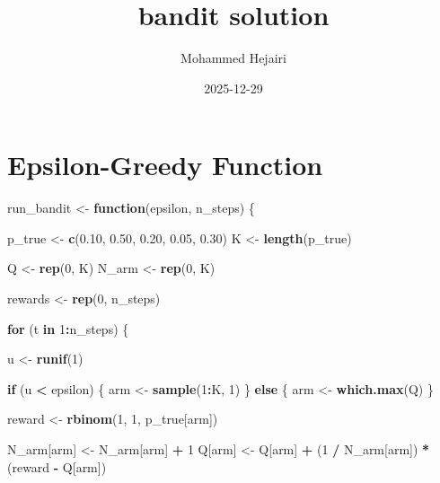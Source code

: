 \documentclass[
]{article}
\title{bandit solution}
\author{Mohammed Hejairi}
\date{2025-12-29}
\newenvironment{Shaded}{\begin{snugshade}}{\end{snugshade}}
\newcommand{\ControlFlowTok}[1]{\textcolor[rgb]{0.13,0.29,0.53}{\textbf{#1}}}
\newcommand{\DecValTok}[1]{\textcolor[rgb]{0.00,0.00,0.81}{#1}}
\newcommand{\FloatTok}[1]{\textcolor[rgb]{0.00,0.00,0.81}{#1}}
\newcommand{\FunctionTok}[1]{\textcolor[rgb]{0.13,0.29,0.53}{\textbf{#1}}}
\newcommand{\NormalTok}[1]{#1}
\newcommand{\OtherTok}[1]{\textcolor[rgb]{0.56,0.35,0.01}{#1}}
\newcommand{\SpecialCharTok}[1]{\textcolor[rgb]{0.81,0.36,0.00}{\textbf{#1}}}
\begin{document}
\maketitle

\section{Epsilon-Greedy Function}\label{epsilon-greedy-function}

\begin{Shaded}
\begin{Highlighting}[]
\NormalTok{run\_bandit }\OtherTok{\textless{}{-}} \ControlFlowTok{function}\NormalTok{(epsilon, n\_steps) \{}

\NormalTok{  p\_true }\OtherTok{\textless{}{-}} \FunctionTok{c}\NormalTok{(}\FloatTok{0.10}\NormalTok{, }\FloatTok{0.50}\NormalTok{, }\FloatTok{0.20}\NormalTok{, }\FloatTok{0.05}\NormalTok{, }\FloatTok{0.30}\NormalTok{)}
\NormalTok{  K }\OtherTok{\textless{}{-}} \FunctionTok{length}\NormalTok{(p\_true)}

\NormalTok{  Q }\OtherTok{\textless{}{-}} \FunctionTok{rep}\NormalTok{(}\DecValTok{0}\NormalTok{, K)}
\NormalTok{  N\_arm }\OtherTok{\textless{}{-}} \FunctionTok{rep}\NormalTok{(}\DecValTok{0}\NormalTok{, K)}

\NormalTok{  rewards }\OtherTok{\textless{}{-}} \FunctionTok{rep}\NormalTok{(}\DecValTok{0}\NormalTok{, n\_steps)}

  \ControlFlowTok{for}\NormalTok{ (t }\ControlFlowTok{in} \DecValTok{1}\SpecialCharTok{:}\NormalTok{n\_steps) \{}

\NormalTok{    u }\OtherTok{\textless{}{-}} \FunctionTok{runif}\NormalTok{(}\DecValTok{1}\NormalTok{)}

    \ControlFlowTok{if}\NormalTok{ (u }\SpecialCharTok{\textless{}}\NormalTok{ epsilon) \{}
\NormalTok{      arm }\OtherTok{\textless{}{-}} \FunctionTok{sample}\NormalTok{(}\DecValTok{1}\SpecialCharTok{:}\NormalTok{K, }\DecValTok{1}\NormalTok{)}
\NormalTok{    \} }\ControlFlowTok{else}\NormalTok{ \{}
\NormalTok{      arm }\OtherTok{\textless{}{-}} \FunctionTok{which.max}\NormalTok{(Q)}
\NormalTok{    \}}

\NormalTok{    reward }\OtherTok{\textless{}{-}} \FunctionTok{rbinom}\NormalTok{(}\DecValTok{1}\NormalTok{, }\DecValTok{1}\NormalTok{, p\_true[arm])}

\NormalTok{    N\_arm[arm] }\OtherTok{\textless{}{-}}\NormalTok{ N\_arm[arm] }\SpecialCharTok{+} \DecValTok{1}
\NormalTok{    Q[arm] }\OtherTok{\textless{}{-}}\NormalTok{ Q[arm] }\SpecialCharTok{+}\NormalTok{ (}\DecValTok{1} \SpecialCharTok{/}\NormalTok{ N\_arm[arm]) }\SpecialCharTok{*}\NormalTok{ (reward }\SpecialCharTok{{-}}\NormalTok{ Q[arm])}


\end{Highlighting}
\end{Shaded}
\end{document}
